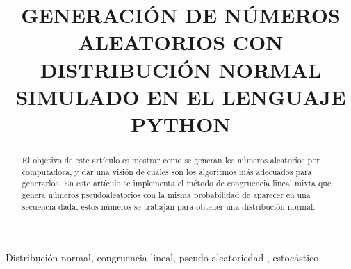 \documentclass[conference,a4paper]{IEEEtran}
\begin{document}
	
\title{GENERACI\'ON DE N\'UMEROS ALEATORIOS CON DISTRIBUCI\'ON NORMAL SIMULADO EN EL LENGUAJE PYTHON}
\author{
}
\maketitle
	
\begin{abstract}
El objetivo de este art\'iculo es mostrar como se generan los n\'umeros aleatorios por computadora, y dar una visi\'on de cu\'ales son los algoritmos m\'as adecuados para generarlos. En este art\'iculo se implementa el m\'etodo de congruencia lineal mixta que genera n\'umeros pseudoaleatorios con la misma probabilidad de aparecer en una secuencia dada, estos n\'umeros se trabajan para obtener una distribuci\'on normal.\\
\end{abstract}
\begin{IEEEkeywords}
Distribuci\'on normal, congruencia lineal, pseudo-aleatoriedad , estoc\'astico, 
\end{IEEEkeywords}
\end{document}

